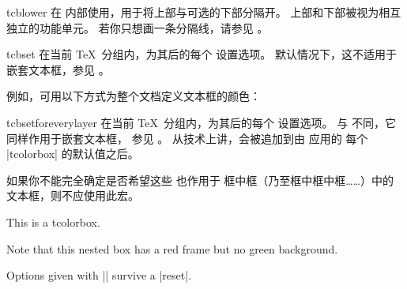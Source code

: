 \begin{docCommand}{tcblower}{}
  在  内部使用，用于将上部与可选的下部分隔开。
  上部和下部被视为相互独立的功能单元。
  若你只想画一条分隔线，请参见 。
\end{docCommand}


\clearpage
\begin{docCommand}{tcbset}{}
  在当前 \TeX\ 分组内，为其后的每个  设置选项。
  默认情况下，这不适用于嵌套文本框，参见 。\par
  例如，可用以下方式为整个文档定义文本框的颜色：
\begin{dispListing}
\end{dispListing}
\end{docCommand}


\begin{docCommand}{tcbsetforeverylayer}{}
  在当前 \TeX\ 分组内，为其后的每个  设置选项。
  与  不同，它同样作用于嵌套文本框，
  参见 。
  从技术上讲，会被追加到由  应用的
  每个 |tcolorbox| 的默认值之后。\par
  如果你不能完全确定是否希望这些 也作用于
  框中框（乃至框中框中框……）中的文本框，则不应使用此宏。
\begin{dispExample}

\begin{tcolorbox}[title=All options for this box]
  This is a tcolorbox.\par\medskip
  \begin{tcolorbox}[title=Nested box]
    Note that this nested box has a red frame but no green background.
  \end{tcolorbox}
\end{tcolorbox}
\bigskip

\begin{tcolorbox}[reset]
  Options given with |\tcbsetforeverylayer| survive a |reset|.
\end{tcolorbox}
\end{dispExample}
\end{docCommand}


